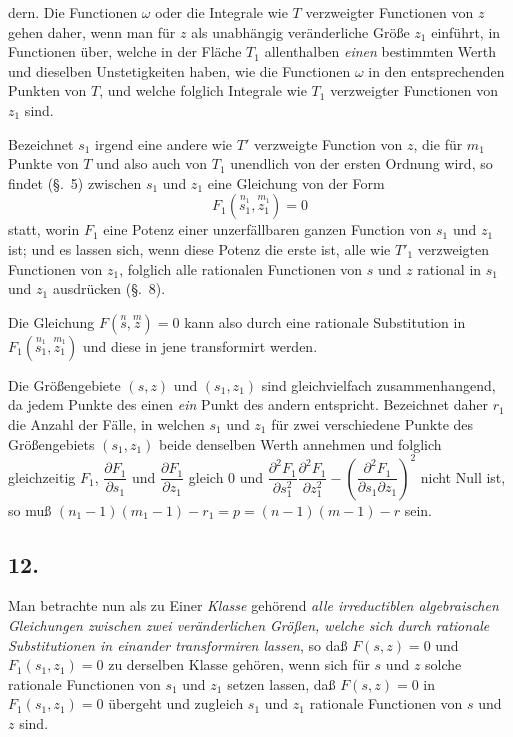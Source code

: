 \documentclass{article}
\begin{document}
dern. Die Functionen $\omega$ oder die Integrale wie $T$ verzweigter Functionen von $z$ gehen daher, wenn man für $z$ als unabhängig veränderliche Größe $z_{1}$ einführt, in Functionen über, welche in der Fläche $T_{1}$ allenthalben \emph{einen} bestimmten Werth und dieselben Unstetigkeiten haben, wie die Functionen $\omega$ in den entsprechenden Punkten von $T$, und welche folglich Integrale wie $T_{1}$ verzweigter Functionen von $z_{1}$ sind.

Bezeichnet $s_{1}$ irgend eine andere wie $T'$ verzweigte Function von $z$, die für $m_{1}$ Punkte von $T$ und also auch von $T_{1}$ unendlich von der ersten Ordnung wird, so findet (§.~5) zwischen $s_{1}$ und $z_{1}$ eine Gleichung von der Form
\[ F_{1}(\overset{n_{1}}{s_{1}}, \overset{m_{1}}{z_{1}}) = 0 \]
statt, worin $F_{1}$ eine Potenz einer unzerfällbaren ganzen Function von $s_{1}$ und $z_{1}$ ist; und es lassen sich, wenn diese Potenz die erste ist, alle wie $T'_{1}$ verzweigten Functionen von $z_{1}$, folglich alle rationalen Functionen von $s$ und $z$ rational in $s_{1}$ und $z_{1}$ ausdrücken (§.~8).

Die Gleichung $F(\overset{n}{s}, \overset{m}{z}) = 0$ kann also durch eine rationale Substitution in $F_{1}(\overset{n_{1}}{s_{1}}, \overset{m_{1}}{z_{1}})$ und diese in jene transformirt werden.

Die Größengebiete $(s, z)$ und $(s_{1}, z_{1})$ sind gleichvielfach zusammenhangend, da jedem Punkte des einen \emph{ein} Punkt des andern entspricht. Bezeichnet daher $r_{1}$ die Anzahl der Fälle, in welchen $s_{1}$ und $z_{1}$ für zwei verschiedene Punkte des Größengebiets $(s_{1}, z_{1})$ beide denselben Werth annehmen und folglich gleichzeitig $F_{1}$, $\dfrac{\partial F_{1}}{\partial s_{1}}$ und $\dfrac{\partial F_{1}}{\partial z_{1}}$ gleich 0 und $\dfrac{\partial^{2}F_{1}}{\partial s_{1}^{2}} \dfrac{\partial^{2}F_{1}}{\partial z_{1}^{2}} - \left(\dfrac{\partial^{2}F_{1}}{\partial s_{1} \partial z_{1}}\right)^{2}$ nicht Null ist, so muß $(n_{1}-1)(m_{1}-1) - r_{1} = p = (n-1)(m-1) - r$ sein.

\subsection*{12.}

Man betrachte nun als zu Einer \emph{Klasse} gehörend \emph{alle irreductiblen algebraischen Gleichungen zwischen zwei veränderlichen Größen, welche sich durch rationale Substitutionen in einander transformiren lassen}, so daß $F(s, z) = 0$ und $F_{1}(s_{1}, z_{1}) = 0$ zu derselben Klasse gehören, wenn sich für $s$ und $z$ solche rationale Functionen von $s_{1}$ und $z_{1}$ setzen lassen, daß $F(s, z) = 0$ in $F_{1}(s_{1}, z_{1}) = 0$ übergeht und zugleich $s_{1}$ und $z_{1}$ rationale Functionen von $s$ und $z$ sind.
\end{document}
